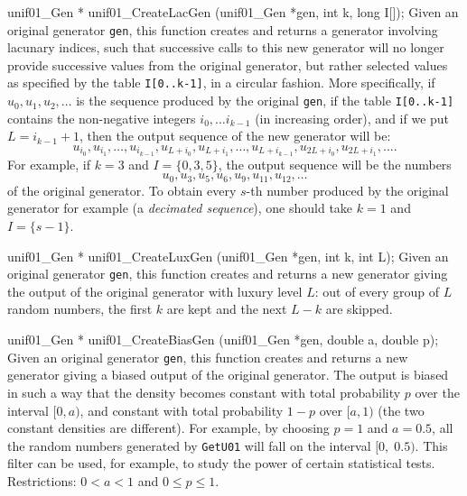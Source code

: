 unif01_Gen * unif01_CreateLacGen (unif01_Gen *gen, int k, long I[]);
\endcode
 \tab
  Given an original generator {\tt gen}, this function
%
  creates and returns a generator involving lacunary indices, such that
  successive calls to this new generator
  will no longer provide successive values from the original
  generator, but rather selected values as specified by
  the table {\tt I[0..k-1]}, in a circular fashion.
  More specifically, if $u_0, u_1, u_2, \dots$ is the sequence
  produced by the original {\tt gen}, if the table {\tt I[0..k-1]}
  contains the non-negative integers $i_0, \dots i_{k-1}$ (in increasing
  order), and if we put $L = i_{k-1}+1$,
  then the output sequence of the new generator will be:
   $$ u_{i_0}, u_{i_1}, \dots, u_{i_{k-1}}, u_{L+i_0}, u_{L+i_1},
      \dots, u_{L+i_{k-1}}, u_{2L+i_0}, u_{2L+i_1}, \dots. $$
  For example, if  $k=3$ and $I = \{0, 3, 5\}$,
  the output sequence will be the numbers
   $$ u_{0}, u_{3}, u_{5}, u_{6}, u_{9}, u_{11}, u_{12}, \dots $$
  of the original generator.
  To obtain every $s$-th number produced by the original generator
  for example (a {\em decimated sequence\/}), one should take
  $k=1$ and $I = \{s-1\}$.
 \endtab
\code


unif01_Gen * unif01_CreateLuxGen (unif01_Gen *gen, int k, int L);
\endcode
 \tab   Given an original generator {\tt gen}, this function
%
  creates and returns a new generator giving the output of the
  original generator with luxury level $L$: out of every group of $L$
  random numbers, the first $k$ are kept and the next $L-k$ are skipped.
 \endtab
\code


unif01_Gen * unif01_CreateBiasGen (unif01_Gen *gen, double a, double p);
\endcode
 \tab  Given an original generator {\tt gen}, this function
  creates and returns a new generator giving a biased output of the
  original generator.  The output is biased
%
  in such a way that the density becomes
  constant with total probability $p$ over the interval $[0, a)$, and
  constant with total probability $1 - p$ over $[a, 1)$ (the two constant
  densities are different). For example, by choosing $p= 1$ and $a = 0.5$,
  all the random numbers generated by {\tt GetU01} will fall
  on the interval $[0,\; 0.5)$. This filter can be used, for example,
  to study the power of certain statistical tests.
  Restrictions: $0 < a < 1$ and $0 \le p \le 1$.
 \endtab
\code


